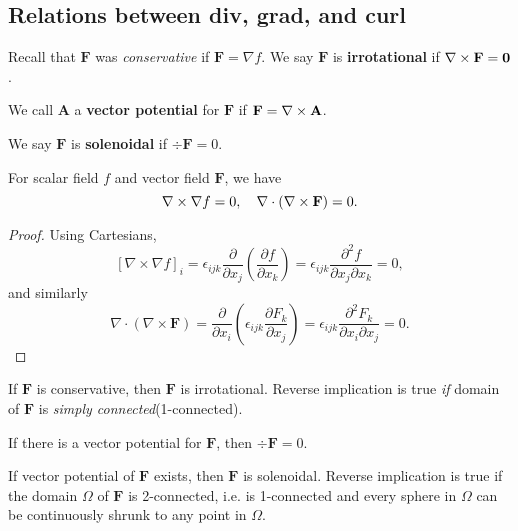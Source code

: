 \subsection{Relations between div, grad, and curl}
\begin{definition}
    Recall that $\mathbf{F}$ was \textit{conservative} if $ \mathbf{F}=\nabla f $. We say $\mathbf{F}$ is \textbf{irrotational} if $ \nabla\times \mathbf{F}= \mathbf{0} $.
\end{definition}
\begin{definition}
    We call $\mathbf{A}$ a \textbf{vector potential} for $\mathbf{F}$ if $ \mathbf{F} = \nabla\times \mathbf{A} $.
\end{definition}
\begin{definition}
    We say $\mathbf{F}$ is \textbf{solenoidal} if $ \div\mathbf{F} = 0 $.
\end{definition}
\begin{proposition}
    For scalar field $f$ and vector field $ \mathbf{F} $, we have 
    \[
        \nabla\times \nabla f = 0,\quad \nabla\cdot (\nabla\times \mathbf{F}) = 0.
    \]
\end{proposition}
\begin{proof}
    Using Cartesians,
    \[
        [\nabla \times \nabla f]_{i}=\epsilon_{i j k} \frac{\partial}{\partial x_{j}}\left(\frac{\partial f}{\partial x_{k}}\right)=\epsilon_{i j k} \frac{\partial^{2} f}{\partial x_{j} \partial x_{k}}=0,
    \]
    and similarly 
    \[
        \nabla \cdot(\nabla \times \mathbf{F})=\frac{\partial}{\partial x_{i}}\left(\epsilon_{i j k} \frac{\partial F_{k}}{\partial x_{j}}\right)=\epsilon_{i j k} \frac{\partial^{2} F_{k}}{\partial x_{i} \partial x_{j}}=0.
    \]
\end{proof}
\begin{corollary}
    If $\mathbf{F}$ is conservative, then $\mathbf{F}$ is irrotational. Reverse implication is true \textit{if} domain of $\mathbf{F}$ is \textit{simply connected}(1-connected). 
\end{corollary}
\begin{corollary}
    If there is a vector potential for $\mathbf{F}$, then $ \div\mathbf{F} = 0 $.
\end{corollary}
\begin{corollary}
    If vector potential of $\mathbf{F}$ exists, then $\mathbf{F}$ is solenoidal. Reverse implication is true if the domain $ \Omega $ of $\mathbf{F}$ is 2-connected, i.e. is 1-connected and every sphere in $ \Omega $ can be continuously shrunk to any point in $ \Omega $. 
\end{corollary}

